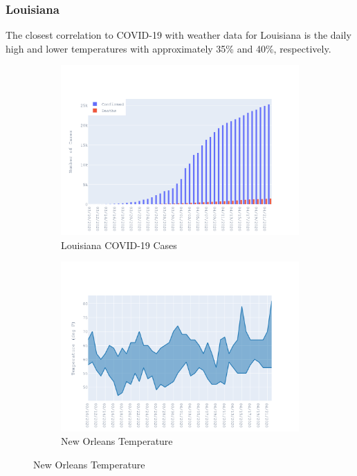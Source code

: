 \documentclass{homework}
\begin{document}
\newpage
\subsubsection{Louisiana}

The closest correlation to COVID-19 with weather data for Louisiana is the daily high and lower temperatures with approximately 35\% and 40\%, respectively.

\begin{figure}[H]
  \centering
  \begin{subfigure}{0.45\linewidth}
    \includegraphics[width=\linewidth]{task4/Louisiana_cases.png}
    \caption{Louisiana COVID-19 Cases}
  \end{subfigure}
  \hfil
  \begin{subfigure}{0.45\linewidth}
    \includegraphics[width=\linewidth]{task4/Louisiana_temp.png}
    \caption{New Orleans Temperature}
  \end{subfigure}


\end{figure}
\end{document}
